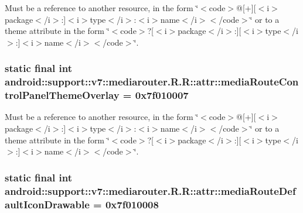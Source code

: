 Must be a reference to another resource, in the form \char`\"{}$<$code$>$@\mbox{[}+\mbox{]}\mbox{[}$<$i$>$package$<$/i$>$:\mbox{]}$<$i$>$type$<$/i$>$:$<$i$>$name$<$/i$>$$<$/code$>$\char`\"{} or to a theme attribute in the form \char`\"{}$<$code$>$?\mbox{[}$<$i$>$package$<$/i$>$:\mbox{]}\mbox{[}$<$i$>$type$<$/i$>$:\mbox{]}$<$i$>$name$<$/i$>$$<$/code$>$\char`\"{}. \hypertarget{classandroid_1_1support_1_1v7_1_1mediarouter_1_1_r_1_1attr_e802179480a4811db38a00f9a1a07914}{
\subsubsection[{mediaRouteControlPanelThemeOverlay}]{\setlength{\rightskip}{0pt plus 5cm}static final int android::support::v7::mediarouter.R.R::attr::mediaRouteControlPanelThemeOverlay = 0x7f010007}}
\label{classandroid_1_1support_1_1v7_1_1mediarouter_1_1_r_1_1attr_e802179480a4811db38a00f9a1a07914}


Must be a reference to another resource, in the form \char`\"{}$<$code$>$@\mbox{[}+\mbox{]}\mbox{[}$<$i$>$package$<$/i$>$:\mbox{]}$<$i$>$type$<$/i$>$:$<$i$>$name$<$/i$>$$<$/code$>$\char`\"{} or to a theme attribute in the form \char`\"{}$<$code$>$?\mbox{[}$<$i$>$package$<$/i$>$:\mbox{]}\mbox{[}$<$i$>$type$<$/i$>$:\mbox{]}$<$i$>$name$<$/i$>$$<$/code$>$\char`\"{}. \hypertarget{classandroid_1_1support_1_1v7_1_1mediarouter_1_1_r_1_1attr_0a06372e06c11dc6d0a1e1cc27db3317}{
\subsubsection[{mediaRouteDefaultIconDrawable}]{\setlength{\rightskip}{0pt plus 5cm}static final int android::support::v7::mediarouter.R.R::attr::mediaRouteDefaultIconDrawable = 0x7f010008}}
\label{classandroid_1_1support_1_1v7_1_1mediarouter_1_1_r_1_1attr_0a06372e06c11dc6d0a1e1cc27db3317}


